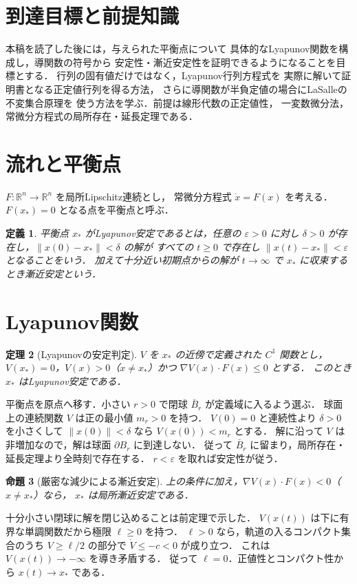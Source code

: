 \documentclass[a5paper,10pt,onecolumn]{jsarticle}
\makeatletter
\theoremstyle{mathnotetheorem}
\newtheorem{theorem}{定理}[section]
\newtheorem{definition}[theorem]{定義}
\newtheorem{proposition}[theorem]{命題}
\renewcommand{\proofname}{証明}
\renewenvironment{proof}[1][\proofname]{%
  \par\pushQED{\qed}\normalfont\topsep4\p@\@plus2\p@\relax
  \trivlist\item[\hskip\labelsep\bfseries #1]\ignorespaces
}{\popQED\endtrivlist\@endpefalse}
\newcommand{\norm}[1]{\lVert #1\rVert}
\makeatother
\begin{document}
\section*{到達目標と前提知識}
本稿を読了した後には，与えられた平衡点について
具体的なLyapunov関数を構成し，導関数の符号から
安定性・漸近安定性を証明できるようになることを目標とする．
行列の固有値だけではなく，Lyapunov行列方程式を
実際に解いて証明書となる正定値行列を得る方法，
さらに導関数が半負定値の場合にLaSalleの不変集合原理を
使う方法を学ぶ．前提は線形代数の正定値性，
一変数微分法，常微分方程式の局所存在・延長定理である．

\section{流れと平衡点}
$F:\mathbb R^n\to\mathbb R^n$ を局所Lipschitz連続とし，
常微分方程式 $\dot x=F(x)$ を考える．
$F(x_*)=0$ となる点を平衡点と呼ぶ．
\begin{definition}
平衡点 $x_*$ がLyapunov安定であるとは，任意の $\varepsilon>0$ に対し
$\delta>0$ が存在し，$\norm{x(0)-x_*}<\delta$ の解が
すべての $t\ge0$ で存在し $\norm{x(t)-x_*}<\varepsilon$ となることをいう．
加えて十分近い初期点からの解が $t\to\infty$ で $x_*$ に収束するとき漸近安定という．
\end{definition}
\section{Lyapunov関数}
\begin{theorem}[Lyapunovの安定判定]
$V$ を $x_*$ の近傍で定義された $C^1$ 関数とし，
$V(x_*)=0$，$V(x)>0$（$x\ne x_*$）かつ
$\nabla V(x)\cdot F(x)\le0$ とする．
このとき $x_*$ はLyapunov安定である．
\end{theorem}
\begin{proof}
平衡点を原点へ移す．小さい $r>0$ で閉球 $\bar B_r$ が定義域に入るよう選ぶ．
球面上の連続関数 $V$ は正の最小値 $m_r>0$ を持つ．
$V(0)=0$ と連続性より $\delta>0$ を小さくして
$\norm{x(0)}<\delta$ なら $V(x(0))<m_r$ とする．
解に沿って $V$ は非増加なので，解は球面 $\partial B_r$ に到達しない．
従って $\bar B_r$ に留まり，局所存在・延長定理より全時刻で存在する．
$r<\varepsilon$ を取れば安定性が従う．
\end{proof}
\begin{proposition}[厳密な減少による漸近安定]
上の条件に加え，$\nabla V(x)\cdot F(x)<0$（$x\ne x_*$）なら，
$x_*$ は局所漸近安定である．
\end{proposition}
\begin{proof}
十分小さい閉球に解を閉じ込めることは前定理で示した．
$V(x(t))$ は下に有界な単調関数だから極限 $\ell\ge0$ を持つ．
$\ell>0$ なら，軌道の入るコンパクト集合のうち
$V\ge\ell/2$ の部分で $\dot V\le-c<0$ が成り立つ．
これは $V(x(t))\to-\infty$ を導き矛盾する．
従って $\ell=0$．正値性とコンパクト性から $x(t)\to x_*$ である．
\end{proof}
\end{document}
